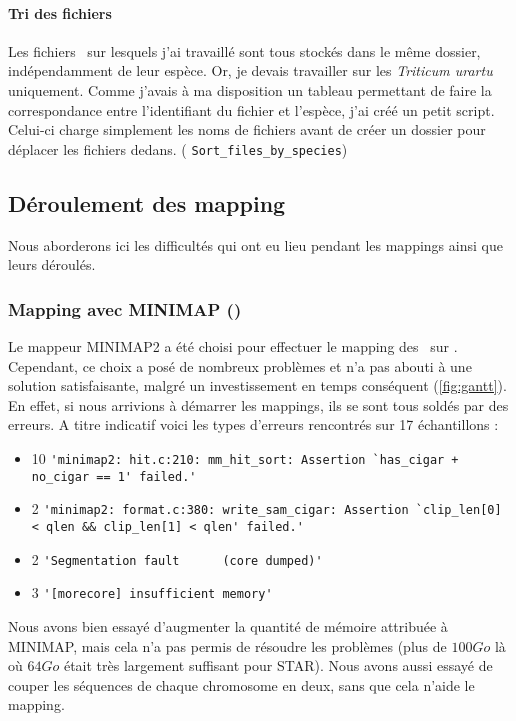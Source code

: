 \documentclass[../main]{subfiles} %
\begin{document}
\paragraph{Tri des fichiers}
Les fichiers \fastq sur lesquels j’ai travaillé sont tous stockés dans le même dossier, indépendamment de leur espèce. Or, je devais travailler sur les \textit{Triticum urartu} uniquement. Comme j’avais à ma disposition un tableau permettant de faire la correspondance entre l’identifiant du fichier et l’espèce, j’ai créé un petit script. Celui-ci charge simplement les noms de fichiers avant de créer un dossier pour déplacer les fichiers dedans. (\cite{florent_f-marchalm1bioinfointernship2024-inrae_agap_ge2pop_2024} \lstinline{Sort_files_by_species})


\subsection{Déroulement des \gls{mapping}}

Nous aborderons ici les difficultés qui ont eu lieu pendant les \glspl{mapping} ainsi que leurs déroulés.

\subsubsection{Mapping avec \gls{MINIMAP} (\GeMo)}
\label{sec:Minimap}

Le \gls{mappeur} \gls{MINIMAP}2 a été choisi pour effectuer le \gls{mapping} des \fastq sur \GeMo. Cependant, ce choix a posé de nombreux problèmes et n'a pas abouti à une solution satisfaisante, malgré un investissement en temps conséquent (\cref{fig:gantt}). En effet, si nous arrivions à démarrer les \glspl{mapping}, ils se sont tous soldés par des erreurs. A titre indicatif voici les types d’erreurs rencontrés sur 17 échantillons :

\begin{itemize}
    \item 10 \lstinline{'minimap2: hit.c:210: mm_hit_sort: Assertion `has_cigar + no_cigar == 1' failed.'}
    \item 2 \lstinline{'minimap2: format.c:380: write_sam_cigar: Assertion `clip_len[0] < qlen && clip_len[1] < qlen' failed.'}
    \item 2 \lstinline{'Segmentation fault      (core dumped)'}
    \item 3 \lstinline{'[morecore] insufficient memory'}
\end{itemize}

Nous avons bien essayé d’augmenter la quantité de mémoire attribuée à \gls{MINIMAP}, mais cela n’a pas permis de résoudre les problèmes (plus de $\num{100} Go$ là où $\num{64} Go$ était très largement suffisant pour \gls{STAR}). Nous avons aussi essayé de couper les séquences de chaque chromosome en deux, sans que cela n'aide le \gls{mapping}. 
\end{document}
